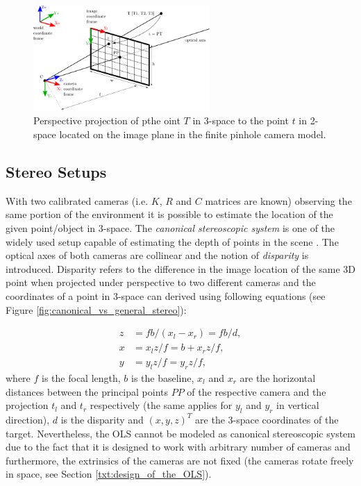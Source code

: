 \begin{figure}[tbh]
	\centering
	\includegraphics[width=0.60\textwidth]{fig/pinhole_camera.pdf}
	\caption{Perspective projection of pthe oint $T$ in 3-space to the point $t$ in 2-space located on the image plane in the finite pinhole camera model.}
	\label{fig:pinhole_camera}
\end{figure}

\subsection{Stereo Setups}

With two calibrated cameras (i.e. $K$, $R$ and $C$ matrices are known) observing the same portion of the environment it is possible to estimate the location of the given point/object in 3-space. The \textit{canonical stereoscopic system} is one of the widely used setup capable of estimating the depth of points in the scene \cite{Cyganek:2007:ICV:1214366}. The optical axes of both cameras are collinear and the notion of \textit{disparity} is introduced. Disparity refers to the difference in the image location of the same 3D point when projected under perspective to two different cameras \cite{Stockman:2001:CV:558008} and the coordinates of a point in 3-space can derived using following equations (see Figure \ref{fig:canonical_vs_general_stereo}):

\begin{align}
	z &= fb/(x_{l} - x_{r}) = fb/d,\\
	x &= x_{l}z/f = b + x_{r}z/f,\\
	y &= y_{l}z/f = y_{r}z/f,
\end{align}
where $f$ is the focal length, $b$ is the baseline, $x_{l}$ and $x_{r}$ are the horizontal distances between the principal points $PP$ of the respective camera and the projection $t_{l}$ and $t_{r}$ respectively (the same applies for $y_{l}$ and $y_{r}$ in vertical direction), $d$ is the disparity and $(x, y, z)^{T}$ are the 3-space coordinates of the target. Nevertheless, the OLS cannot be modeled as canonical stereoscopic system due to the fact that it is designed to work with arbitrary number of cameras and furthermore, the extrinsics of the cameras are not fixed (the cameras rotate freely in space, see Section \ref{txt:design_of_the_OLS}).

